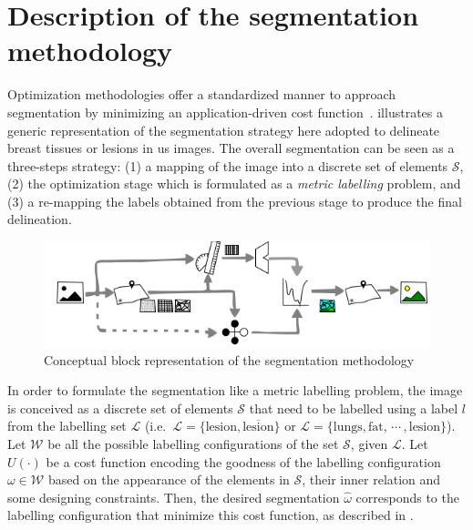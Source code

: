 \graphicspath{ {./content/method/figures/visual_cues/} {./content/method/figures/}}

\section{Description of the segmentation methodology} 

Optimization methodologies offer a standardized manner to approach segmentation by minimizing an application-driven cost function~\cite{cremers2007review}.
 illustrates a generic representation of the segmentation strategy here adopted to delineate breast tissues or lesions in \ac{us} images. 
The overall segmentation can be seen as a three-steps strategy: 
(1) a mapping of the image into a discrete set of elements $\mathcal{S}$, 
(2) the optimization stage which is formulated as a \emph{metric labelling} problem, 
and (3) a re-mapping the labels obtained from the previous stage to produce the final delineation. 

\begin{figure}[htpb]
  \centering
  \includegraphics[width=0.9\linewidth]{method}
  \caption{Conceptual block representation of the segmentation methodology}
  \label{fig:method}
\end{figure}


In order to formulate the segmentation like a metric labelling problem, the image is conceived as a discrete set of elements $\mathcal{S}$ that need to be labelled using a label $l$ from the labelling set $\mathcal{L}$ 
(i.e.\, $\mathcal{L} = \{\text{lesion}, \overline{\text{lesion}}\}$ 
or $\mathcal{L} = \{\text{lungs}, \text{fat},\,\cdots\,, \text{lesion}\}$).
Let $\mathcal{W}$ be all the possible labelling configurations of the set $\mathcal{S}$, given $\mathcal{L}$.
Let $U(\cdot)$ be a cost function encoding the goodness of the labelling configuration $\omega \in \mathcal{W}$ based on the appearance of the elements in $\mathcal{S}$, their inner relation and some designing constraints.
Then, the desired segmentation $\hat{\omega}$ corresponds to the labelling configuration that minimize this cost function, as described in .


